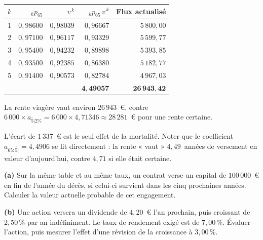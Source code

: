 \begin{corrige}
\begin{center}\small
\begin{tabular}{crrrr}
\toprule
$k$ & ${}_{k}p_{65}$ & $v^{\,k}$ & ${}_{k}p_{65}\,v^{\,k}$ & Flux actualisé \\
\midrule
1 & $0{,}98600$ & $0{,}98039$ & $0{,}96667$ & $5\,800{,}00$ \\
2 & $0{,}97100$ & $0{,}96117$ & $0{,}93329$ & $5\,599{,}77$ \\
3 & $0{,}95400$ & $0{,}94232$ & $0{,}89898$ & $5\,393{,}85$ \\
4 & $0{,}93500$ & $0{,}92385$ & $0{,}86380$ & $5\,182{,}77$ \\
5 & $0{,}91400$ & $0{,}90573$ & $0{,}82784$ & $4\,967{,}03$ \\
\midrule
  & & & $\mathbf{4{,}49057}$ & $\mathbf{26\,943{,}42}$ \\
\bottomrule
\end{tabular}
\end{center}
La rente viagère vaut environ $26\,943$~\euro, contre
$6\,000 \times a_{\overline{5}|2\%} = 6\,000 \times 4{,}71346 \approx 28\,281$~\euro{}
pour une rente certaine.

\medskip
L'écart de $1\,337$~\euro{} est le seul effet de la mortalité. Noter que le
coefficient $a_{65:\overline{5}|} = 4{,}4906$ se lit directement : la rente
« vaut » $4{,}49$~années de versement en valeur d'aujourd'hui, contre $4{,}71$
si elle était certaine.
\end{corrige}

\begin{exercice}
\textbf{(a)} Sur la même table et au même taux, un contrat verse un capital de
$100\,000$~\euro{} en fin de l'année du décès, si celui-ci survient dans les
cinq prochaines années. Calculer la valeur actuelle probable de cet engagement.

\medskip
\textbf{(b)} Une action versera un dividende de $4{,}20$~\euro{} l'an prochain,
puis croissant de $2{,}50\,\%$ par an indéfiniment. Le taux de rendement exigé
est de $7{,}00\,\%$. Évaluer l'action, puis mesurer l'effet d'une révision de la
croissance à $3{,}00\,\%$.
\end{exercice}

